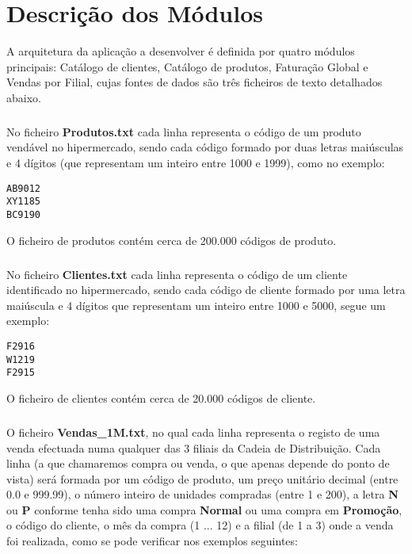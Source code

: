 \chapter{Descrição dos Módulos}

A arquitetura da aplicação a desenvolver é definida por quatro módulos principais: Catálogo de clientes, Catálogo de produtos, Faturação Global e Vendas por Filial, cujas fontes de dados são três ficheiros de texto detalhados abaixo.
 
\paragraph{}
No ficheiro \textbf{Produtos.txt} cada linha representa o código de um produto vendável no hipermercado, sendo cada código formado por duas letras maiúsculas e 4 dígitos (que representam um inteiro entre 1000 e 1999), como no exemplo: 

\begin{verbatim}
AB9012
XY1185
BC9190
\end{verbatim}

O ficheiro de produtos contém cerca de 200.000 códigos de produto. 

\paragraph{}
No ficheiro \textbf{Clientes.txt} cada linha representa o código de um cliente identificado no hipermercado, sendo cada código de cliente formado por uma letra maiúscula e 4 dígitos que representam um inteiro entre 1000 e 5000, segue um exemplo: 

\begin{Verbatim}
F2916
W1219
F2915
\end{Verbatim}

O ficheiro de clientes contém cerca de 20.000 códigos de cliente. 

\paragraph{}
O ficheiro \textbf{Vendas\_1M.txt}, no qual cada linha representa o registo de uma venda efectuada numa qualquer das 3 filiais da Cadeia de Distribuição. Cada linha (a que chamaremos compra ou venda, o que apenas depende do ponto de vista) será formada por um código de produto, um preço unitário decimal (entre 0.0 e 999.99), o número inteiro de unidades compradas (entre 1 e 200), a letra \textbf{N} ou \textbf{P} conforme tenha sido uma compra \textbf{Normal} ou uma compra em \textbf{Promoção}, o código do cliente, o mês da compra (1 ... 12) e a filial (de 1 a 3) onde a venda foi realizada, como se pode verificar nos exemplos seguintes:
 

